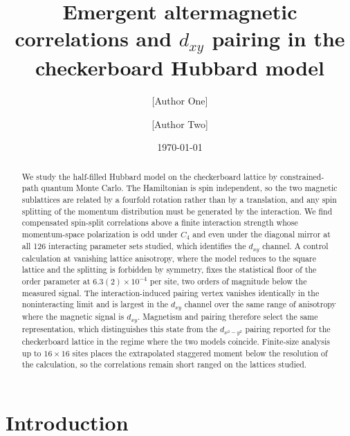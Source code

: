 \documentclass[aps,prb,reprint,superscriptaddress,amsmath,amssymb,floatfix]{revtex4-2}
\begin{document}
\title{Emergent altermagnetic correlations and $d_{xy}$ pairing in the
checkerboard Hubbard model}

\author{[Author One]}
\affiliation{[Affiliation]}
\author{[Author Two]}
\affiliation{[Affiliation]}

\date{\today}

\begin{abstract}
We study the half-filled Hubbard model on the checkerboard lattice by
constrained-path quantum Monte Carlo. The Hamiltonian is spin independent, so the
two magnetic sublattices are related by a fourfold rotation rather than by a
translation, and any spin splitting of the momentum distribution must be
generated by the interaction. We find compensated spin-split correlations above a
finite interaction strength whose momentum-space polarization is odd under $C_4$
and even under the diagonal mirror at all 126 interacting parameter sets studied,
which identifies the $d_{xy}$ channel. A control calculation at vanishing lattice
anisotropy, where the model reduces to the square lattice and the splitting is
forbidden by symmetry, fixes the statistical floor of the order parameter at
$6.3(2)\times10^{-4}$ per site, two orders of magnitude below the measured signal.
The interaction-induced pairing vertex vanishes identically in the noninteracting
limit and is largest in the $d_{xy}$ channel over the same range of anisotropy
where the magnetic signal is $d_{xy}$. Magnetism and pairing therefore select the
same representation, which distinguishes this state from the $d_{x^2-y^2}$
pairing reported for the checkerboard lattice in the regime where the two models
coincide. Finite-size analysis up to $16\times16$ sites places the extrapolated
staggered moment below the resolution of the calculation, so the correlations
remain short ranged on the lattices studied.
\end{abstract}

\maketitle

\section{Introduction}
\end{document}

